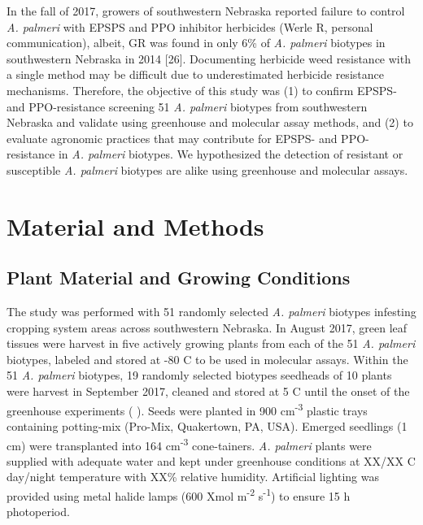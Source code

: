 \documentclass[10pt,letterpaper]{article}
\begin{document}
In the fall of 2017, growers of southwestern Nebraska reported failure
to control \emph{A. palmeri} with EPSPS and PPO inhibitor herbicides
(Werle R, personal communication), albeit, GR was found in only 6\% of
\emph{A. palmeri} biotypes in southwestern Nebraska in 2014 {[}26{]}.
Documenting herbicide weed resistance with a single method may be
difficult due to underestimated herbicide resistance mechanisms.
Therefore, the objective of this study was (1) to confirm EPSPS- and
PPO-resistance screening 51 \emph{A. palmeri} biotypes from southwestern
Nebraska and validate using greenhouse and molecular assay methods, and
(2) to evaluate agronomic practices that may contribute for EPSPS- and
PPO-resistance in \emph{A. palmeri} biotypes. We hypothesized the
detection of resistant or susceptible \emph{A. palmeri} biotypes are
alike using greenhouse and molecular assays.

\hypertarget{material-and-methods}{%
\section{Material and Methods}\label{material-and-methods}}

\hypertarget{plant-material-and-growing-conditions}{%
\subsection{Plant Material and Growing
Conditions}\label{plant-material-and-growing-conditions}}

The study was performed with 51 randomly selected \emph{A. palmeri}
biotypes infesting cropping system areas across southwestern Nebraska.
In August 2017, green leaf tissues were harvest in five actively growing
plants from each of the 51 \emph{A. palmeri} biotypes, labeled and
stored at -80 C to be used in molecular assays. Within the 51 \emph{A.
palmeri} biotypes, 19 randomly selected biotypes seedheads of 10 plants
were harvest in September 2017, cleaned and stored at 5 C until the
onset of the greenhouse experiments ( ). Seeds were planted in 900
cm\textsuperscript{-3} plastic trays containing potting-mix
(Pro-Mix\textsuperscript \textregistered, Quakertown, PA, USA). Emerged
seedlings (1 cm) were transplanted into 164 cm\textsuperscript{-3}
cone-tainers. \emph{A. palmeri} plants were supplied with adequate water
and kept under greenhouse conditions at XX/XX C day/night temperature
with XX\% relative humidity. Artificial lighting was provided using
metal halide lamps (600 Xmol m\textsuperscript{-2}
s\textsuperscript{-1}) to ensure 15 h photoperiod.
\end{document}
